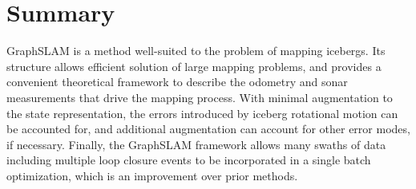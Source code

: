 \label{sec.DesignConsiderations}

\section{Summary}

GraphSLAM is a method well-suited to the problem of mapping icebergs. Its structure allows efficient solution of large mapping problems, and provides a convenient theoretical framework to describe the odometry and sonar measurements that drive the mapping process. With minimal augmentation to the state representation, the errors introduced by iceberg rotational motion can be accounted for, and additional augmentation can account for other error modes, if necessary. Finally, the GraphSLAM framework allows many swaths of data including multiple loop closure events to be incorporated in a single batch optimization, which is an improvement over prior methods.